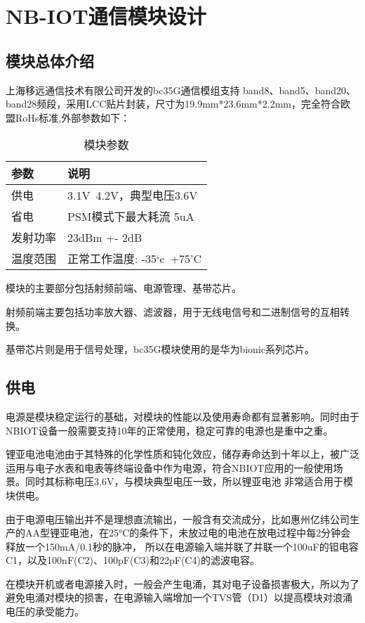 
\chapter{NB-IOT通信模块设计}
\section{模块总体介绍}

上海移远通信技术有限公司开发的bc35G通信模组支持 band8、band5、band20、band28频段，采用LCC贴片封装，尺寸为19.9mm*23.6mm*2.2mm，完全符合欧盟RoHs标准\cite{RoHs},外部参数如下：

\begin{table}[h!]
\caption{模块参数}
\begin{tabular}{ll}
\toprule
参数&说明\\
\midrule
供电&3.1V~4.2V，典型电压3.6V\\
省电&PSM模式下最大耗流 5uA\\
发射功率&23dBm +- 2dB\\
温度范围&正常工作温度: -35‘c~+75'C\\
\bottomrule
\end{tabular}
\label{模块参数}
\end{table}

模块的主要部分包括射频前端、电源管理、基带芯片。

射频前端主要包括功率放大器、滤波器，用于无线电信号和二进制信号的互相转换。

基带芯片则是用于信号处理，bc35G模块使用的是华为bionic系列芯片。


\section{供电}
电源是模块稳定运行的基础，对模块的性能以及使用寿命都有显著影响。同时由于NBIOT设备一般需要支持10年的正常使用，稳定可靠的电源也是重中之重。

锂亚电池电池由于其特殊的化学性质和钝化效应，储存寿命达到十年以上，被广泛运用与电子水表和电表等终端设备中作为电源，符合NBIOT应用的一般使用场景。同时其标称电压3.6V，与模块典型电压一致，所以锂亚电池
非常适合用于模块供电。

由于电源电压输出并不是理想直流输出，一般含有交流成分，比如惠州亿纬公司生产的AA型锂亚电池\cite{锂亚电池}，在25°C的条件下，未放过电的电池在放电过程中每2分钟会释放一个150mA/0.1秒的脉冲，
所以在电源输入端并联了并联一个100uF的钽电容C1，以及100nF(C2)、100pF(C3)和22pF(C4)的滤波电容。

在模块开机或者电源接入时，一般会产生电涌，其对电子设备损害极大，所以为了避免电涌对模块的损害，在电源输入端增加一个TVS管（D1）以提高模块对浪涌电压的承受能力。

